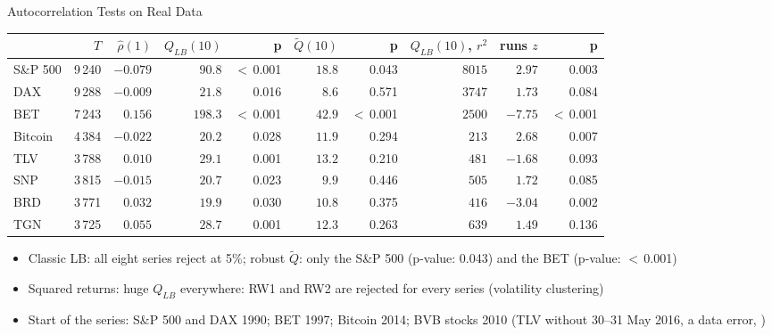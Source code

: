 \begin{frame}{Autocorrelation Tests on Real Data}
\itemsize{\footnotesize}
\begin{center}
\scriptsize
\begin{tabular}{lrrrrrrrrr}
\toprule
& $T$ & $\hat\rho(1)$ & $Q_{LB}(10)$ & p & $\tilde Q(10)$ & p & $Q_{LB}(10)$, $r^2$ & runs $z$ & p \\
\midrule
S\&P 500 & 9\,240 & ${-0.079}$ & $90.8$ & $<$\,0.001 & $18.8$ & 0.043 & $8015$ & ${2.97}$ & 0.003 \\
DAX & 9\,288 & ${-0.009}$ & $21.8$ & 0.016 & $8.6$ & 0.571 & $3747$ & ${1.73}$ & 0.084 \\
BET & 7\,243 & ${0.156}$ & $198.3$ & $<$\,0.001 & $42.9$ & $<$\,0.001 & $2500$ & ${-7.75}$ & $<$\,0.001 \\
Bitcoin & 4\,384 & ${-0.022}$ & $20.2$ & 0.028 & $11.9$ & 0.294 & $213$ & ${2.68}$ & 0.007 \\
TLV & 3\,788 & ${0.010}$ & $29.1$ & 0.001 & $13.2$ & 0.210 & $481$ & ${-1.68}$ & 0.093 \\
SNP & 3\,815 & ${-0.015}$ & $20.7$ & 0.023 & $9.9$ & 0.446 & $505$ & ${1.72}$ & 0.085 \\
BRD & 3\,771 & ${0.032}$ & $19.9$ & 0.030 & $10.8$ & 0.375 & $416$ & ${-3.04}$ & 0.002 \\
TGN & 3\,725 & ${0.055}$ & $28.7$ & 0.001 & $12.3$ & 0.263 & $639$ & ${1.49}$ & 0.136 \\
\bottomrule
\end{tabular}
\end{center}
\begin{itemize}
    \item Classic LB: all eight series reject at 5\%; robust $\tilde Q$: only the S\&P 500 (p-value: 0.043) and the BET (p-value: $<$\,0.001)
    \item Squared returns: huge $Q_{LB}$ everywhere: RW1 and RW2 are rejected for every series (volatility clustering)
    \item Start of the series: S\&P 500 and DAX 1990; BET 1997; Bitcoin 2014; BVB stocks 2010 (TLV without 30--31 May 2016, a data error, )
\end{itemize}
\end{frame}


